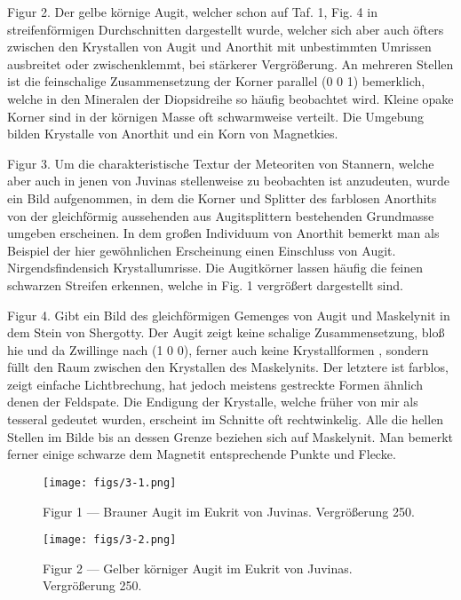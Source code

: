 \documentclass[a4paper, 11pt, oneside, polutonikogreek, german]{article}
\begin{document}
Figur 2. Der gelbe körnige Augit, welcher schon auf Taf. 1, Fig. 4 in streifenförmigen Durchschnitten dargestellt wurde, welcher sich aber auch öfters zwischen den Krystallen von Augit und Anorthit mit unbestimmten Umrissen ausbreitet oder zwischenklemmt, bei stärkerer Vergrößerung. An mehreren Stellen ist die feinschalige Zusammensetzung der Korner parallel (0 0 1) bemerklich, welche in den Mineralen der Diopsidreihe so häufig beobachtet wird. Kleine opake Korner sind in der körnigen Masse oft schwarmweise verteilt. Die Umgebung bilden Krystalle von Anorthit und ein Korn von Magnetkies.

Figur 3. Um die charakteristische Textur der Meteoriten von Stannern, welche aber auch in jenen von Juvinas stellenweise zu beobachten ist anzudeuten, wurde ein Bild aufgenommen, in dem die Korner und Splitter des farblosen Anorthits von der gleichförmig aussehenden aus Augitsplittern bestehenden Grundmasse umgeben erscheinen. In dem großen Individuum von Anorthit bemerkt man als Beispiel der hier gewöhnlichen Erscheinung einen Einschluss von Augit. Nirgendsfindensich Krystallumrisse. Die Augitkörner lassen häufig die feinen schwarzen Streifen erkennen, welche in Fig. 1 vergrößert dargestellt sind.

Figur 4. Gibt ein Bild des gleichförmigen Gemenges von Augit und Maskelynit in dem Stein von Shergotty. Der Augit zeigt keine schalige Zusammensetzung, bloß hie und da Zwillinge nach (1 0 0), ferner auch keine Krystallformen , sondern füllt den Raum zwischen den Krystallen des Maskelynits. Der letztere ist farblos, zeigt einfache Lichtbrechung, hat jedoch meistens gestreckte Formen ähnlich denen der Feldspate. Die Endigung der Krystalle, welche früher von mir als tesseral gedeutet wurden, erscheint im Schnitte oft rechtwinkelig. Alle die hellen Stellen im Bilde bis an dessen Grenze beziehen sich auf Maskelynit. Man bemerkt ferner einige schwarze dem Magnetit entsprechende Punkte und Flecke.
\clearpage

\vspace*{\fill}
\begin{figure}[H]
\centering
\texttt{[image: figs/3-1.png]}
\caption{\small Figur 1 --- Brauner Augit im Eukrit von Juvinas. Vergrößerung 250.}
\end{figure}
\vspace*{\fill}
\clearpage

\vspace*{\fill}
\begin{figure}[H]
\centering
\texttt{[image: figs/3-2.png]}
\caption{\small Figur 2 --- Gelber körniger Augit im Eukrit von Juvinas. Vergrößerung 250.}
\end{figure}
\vspace*{\fill}
\clearpage
\end{document}
